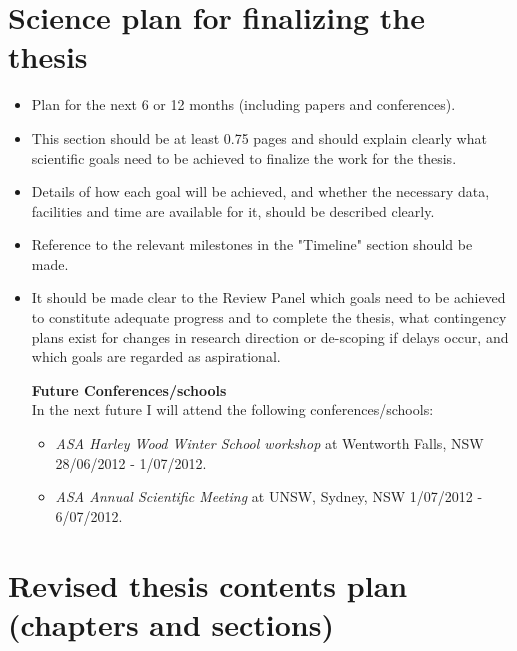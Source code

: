 \documentclass[useAMS,usenatbib,onecolumn]{mnras}
\begin{document}
\section{Science plan for finalizing the thesis}
\label{sec:sciencePlan}

\begin{itemize}
  \item{Plan for the next 6 or 12 months (including papers and conferences).} \\
\item{This section should be at least 0.75 pages and should explain clearly what scientific goals need to be achieved to finalize the work for the thesis.}
 \item{Details of how each goal will be achieved, and whether the necessary data, facilities and time are available for it, should be described clearly.}
\item{Reference to the relevant milestones in the "Timeline" section should be made.}
\item{It should be made clear to the Review Panel which goals need to be achieved to constitute adequate progress and to complete the thesis, what contingency plans exist for changes in research direction or de-scoping if delays occur, and which goals are regarded as aspirational.}

  \textbf{Future Conferences/schools\\}
  In the next future I will attend the following conferences/schools:
  \begin{itemize}
    \item{\textit{ASA Harley Wood Winter School workshop}} at Wentworth Falls, NSW 28/06/2012 - 1/07/2012.
    \item{\textit{ASA Annual Scientific Meeting}} at UNSW, Sydney, NSW 1/07/2012 - 6/07/2012.
  \end{itemize}

\end{itemize}


\section{Revised thesis contents plan (chapters and sections)}
\label{sec:thesisContents}
\end{document}

